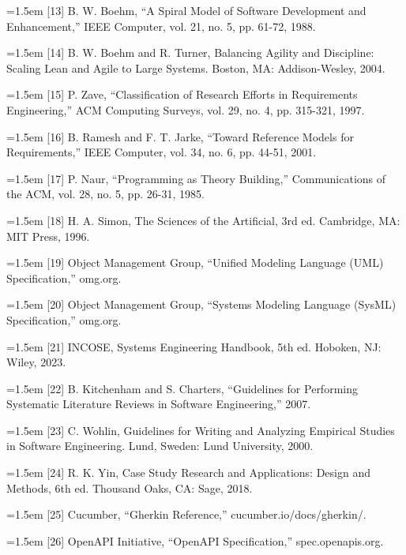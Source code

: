 \documentclass[11pt,a4paper]{article}
\begin{document}
\noindent\hangindent=1.5em [13] B. W. Boehm, ``A Spiral Model of Software Development and Enhancement,'' IEEE Computer, vol. 21, no. 5, pp. 61-72, 1988.

\noindent\hangindent=1.5em [14] B. W. Boehm and R. Turner, Balancing Agility and Discipline: Scaling Lean and Agile to Large Systems. Boston, MA: Addison-Wesley, 2004.

\noindent\hangindent=1.5em [15] P. Zave, ``Classification of Research Efforts in Requirements Engineering,'' ACM Computing Surveys, vol. 29, no. 4, pp. 315-321, 1997.

\noindent\hangindent=1.5em [16] B. Ramesh and F. T. Jarke, ``Toward Reference Models for Requirements,'' IEEE Computer, vol. 34, no. 6, pp. 44-51, 2001.

\noindent\hangindent=1.5em [17] P. Naur, ``Programming as Theory Building,'' Communications of the ACM, vol. 28, no. 5, pp. 26-31, 1985.

\noindent\hangindent=1.5em [18] H. A. Simon, The Sciences of the Artificial, 3rd ed. Cambridge, MA: MIT Press, 1996.

\noindent\hangindent=1.5em [19] Object Management Group, ``Unified Modeling Language (UML) Specification,'' omg.org.

\noindent\hangindent=1.5em [20] Object Management Group, ``Systems Modeling Language (SysML) Specification,'' omg.org.

\noindent\hangindent=1.5em [21] INCOSE, Systems Engineering Handbook, 5th ed. Hoboken, NJ: Wiley, 2023.

\noindent\hangindent=1.5em [22] B. Kitchenham and S. Charters, ``Guidelines for Performing Systematic Literature Reviews in Software Engineering,'' 2007.

\noindent\hangindent=1.5em [23] C. Wohlin, Guidelines for Writing and Analyzing Empirical Studies in Software Engineering. Lund, Sweden: Lund University, 2000.

\noindent\hangindent=1.5em [24] R. K. Yin, Case Study Research and Applications: Design and Methods, 6th ed. Thousand Oaks, CA: Sage, 2018.

\noindent\hangindent=1.5em [25] Cucumber, ``Gherkin Reference,'' cucumber.io/docs/gherkin/.

\noindent\hangindent=1.5em [26] OpenAPI Initiative, ``OpenAPI Specification,'' spec.openapis.org.
\end{document}
